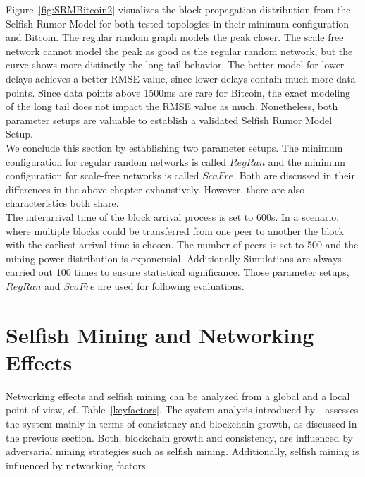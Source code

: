 Figure~\ref{fig:SRMBitcoin2} visualizes the block propagation distribution from the Selfish Rumor Model for both tested topologies in their minimum configuration and Bitcoin. The regular random graph models the peak closer. The scale free network cannot model the peak as good as the regular random network, but the curve shows more distinctly the long-tail behavior. The better model for lower delays achieves a better RMSE value, since lower delays contain much more data points. Since data points above 1500ms are rare for Bitcoin, the exact modeling of the long tail does not impact the RMSE value as much. Nonetheless, both parameter setups are valuable to establish a validated Selfish Rumor Model Setup.\\
We conclude this section by establishing two parameter setups. The minimum configuration for regular random networks is called $RegRan$ and the minimum configuration for scale-free networks is called $ScaFre$. Both are discussed in their differences in the above chapter exhaustively. However, there are also characteristics both share.\\
The interarrival time of the block arrival process is set to 600s. In a scenario, where multiple blocks could be transferred from one peer to another the block with the earliest arrival time is chosen. The number of peers is set to 500 and the mining power distribution is exponential. Additionally Simulations are always carried out 100 times to ensure statistical significance.
Those parameter setups, $RegRan$ and $ScaFre$ are used for following evaluations.

\section{Selfish Mining and Networking Effects}
Networking effects and selfish mining can be analyzed from a global and a local point of view, cf. Table~\ref{keyfactors}. The system analysis introduced by~~assesses the system mainly in terms of consistency and blockchain growth, as discussed in the previous section. Both, blockchain growth and consistency, are influenced by adversarial mining strategies such as selfish mining. Additionally, selfish mining is influenced by networking factors.

